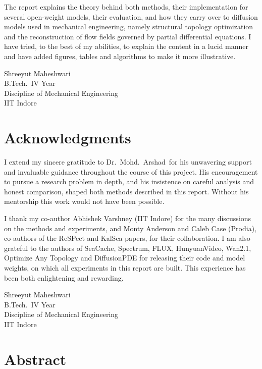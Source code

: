 \documentclass[12pt,a4paper,oneside]{report}
\theoremstyle{definition}
\theoremstyle{remark}
\newcommand{\studentname}{Shreeyut Maheshwari}
\newcommand{\guidename}{Dr.\ Mohd.\ Arshad}
\newcommand{\discipline}{Mechanical Engineering}
\begin{document}
The report explains the theory behind both methods, their implementation for several open-weight models, their evaluation, and how they carry over to diffusion models used in mechanical engineering, namely structural topology optimization and the reconstruction of flow fields governed by partial differential equations. I have tried, to the best of my abilities, to explain the content in a lucid manner and have added figures, tables and algorithms to make it more illustrative.

\vspace{1cm}
\noindent\studentname\\
B.Tech.\ IV Year\\
Discipline of \discipline\\
IIT Indore

\chapter*{Acknowledgments}
I extend my sincere gratitude to \guidename\ for his unwavering support and invaluable guidance throughout the course of this project. His encouragement to pursue a research problem in depth, and his insistence on careful analysis and honest comparison, shaped both methods described in this report. Without his mentorship this work would not have been possible.

I thank my co-author Abhishek Varshney (IIT Indore) for the many discussions on the methods and experiments, and Monty Anderson and Caleb Case (Prodia), co-authors of the ReSPect and KalSea papers, for their collaboration. I am also grateful to the authors of SeaCache, Spectrum, FLUX, HunyuanVideo, Wan2.1, Optimize Any Topology and DiffusionPDE for releasing their code and model weights, on which all experiments in this report are built. This experience has been both enlightening and rewarding.

\vspace{1cm}
\noindent\studentname\\
B.Tech.\ IV Year\\
Discipline of \discipline\\
IIT Indore

\chapter*{Abstract}

\end{document}

